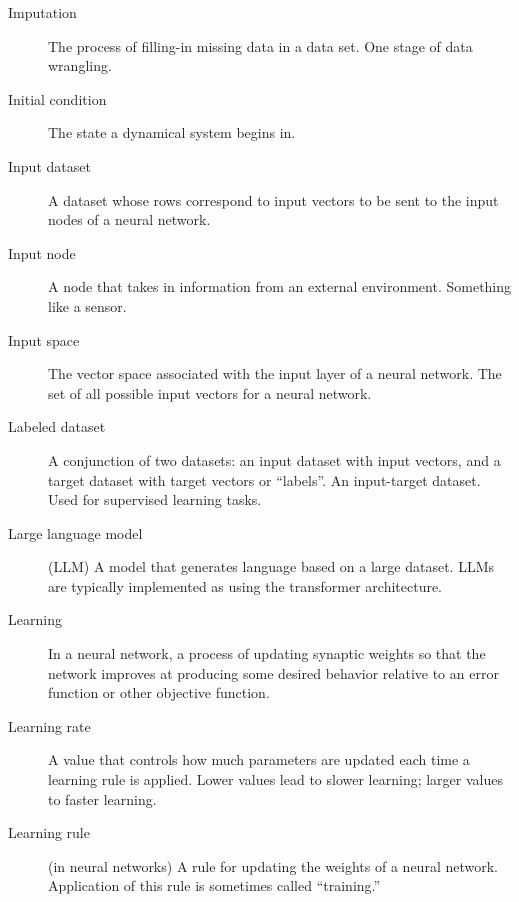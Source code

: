 \begin{description}
\item[Imputation] The process of filling-in missing data in a data set. One stage of data wrangling.

\item[Initial condition] The state a dynamical system begins in.

\item[Input dataset] A dataset whose rows correspond to input vectors to be sent to the input nodes of a neural network.

\item[Input node] A node that takes in information from an external environment. Something like a sensor.

\item[Input space] The vector space associated with the input layer of a neural network. The set of all possible input vectors for a neural network.





\item[Labeled dataset] A conjunction of two datasets: an input dataset with input vectors, and a target dataset with target vectors or ``labels''. An input-target dataset. Used for supervised learning tasks.  

\item[Large language model] (LLM) A model that generates language based on a large dataset.  LLMs are typically implemented as using the transformer architecture.

\item[Learning] In a neural network, a process of updating synaptic weights so that the network improves at producing some desired behavior relative to an error function or other objective function.

\item[Learning rate] A value that controls how much parameters are updated each time a learning rule is applied. Lower values lead to slower learning; larger values to faster learning.

\item[Learning rule] (in neural networks) A rule for updating the weights of a neural network. Application of this rule is sometimes called ``training.''


\end{description}
